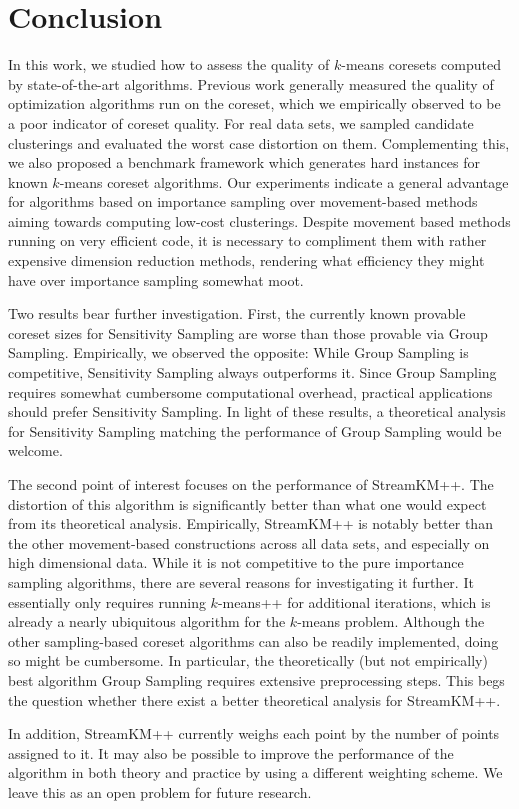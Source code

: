 \section{Conclusion} \label{sec:conclusion}
In this work, we studied how to assess the quality of $k$-means coresets computed by state-of-the-art algorithms. 
Previous work generally measured the quality of optimization algorithms run on the coreset, which we empirically observed to be a poor indicator of coreset quality.
For real data sets, we sampled candidate clusterings and evaluated the worst case distortion on them. Complementing this, we also proposed a benchmark framework which generates hard instances for known $k$-means coreset algorithms. Our experiments indicate a general advantage for algorithms based on importance sampling over movement-based methods aiming towards computing low-cost clusterings.
Despite movement based methods running on very efficient code, it is necessary to compliment them with rather expensive dimension reduction methods, rendering what efficiency they might have over importance sampling somewhat moot.

Two results bear further investigation. First, the currently known provable coreset sizes for Sensitivity Sampling are worse than those provable via Group Sampling. Empirically, we observed the opposite: While Group Sampling is competitive, Sensitivity Sampling always outperforms it. Since Group Sampling requires somewhat cumbersome computational overhead, practical applications should prefer Sensitivity Sampling. In light of these results, a theoretical analysis for Sensitivity Sampling matching the performance of Group Sampling would be welcome.

The second point of interest focuses on the performance of StreamKM++. The distortion of this algorithm is significantly better than what one would expect from its theoretical analysis.
Empirically, StreamKM++ is notably better than the other movement-based constructions across all data sets, and especially on high dimensional data.
While it is not competitive to the pure importance sampling algorithms, there are several reasons for investigating it further. It essentially only requires running $k$-means++ for additional iterations, which is already a nearly ubiquitous algorithm for the $k$-means problem. Although the other sampling-based coreset algorithms can also be readily implemented, doing so might be cumbersome. In particular, the theoretically (but not empirically) best algorithm Group Sampling requires extensive preprocessing steps.
This begs the question whether there exist a better theoretical analysis for StreamKM++.

In addition, StreamKM++ currently weighs each point by the number of points assigned to it. It may also be possible to improve the performance of the algorithm in both theory and practice by using a different weighting scheme. 
We leave this as an open problem for future research.
